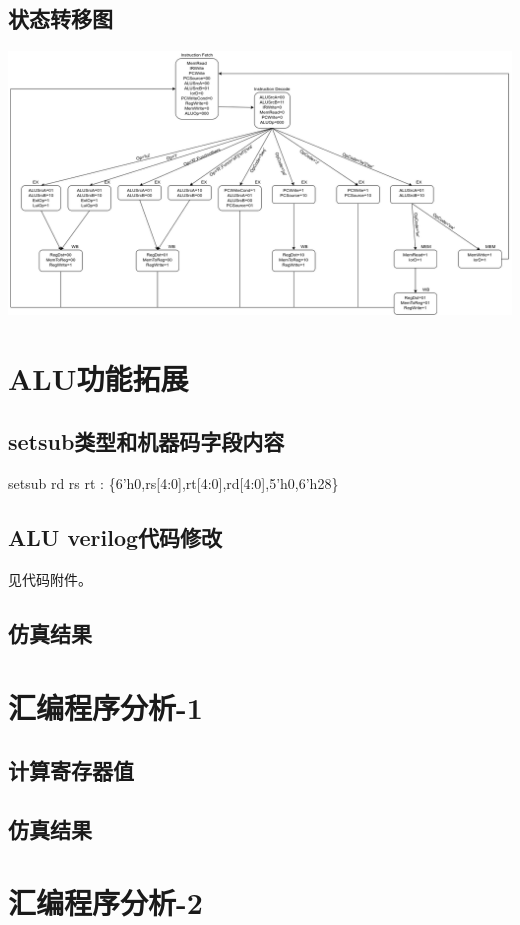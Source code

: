 \documentclass{article}
\begin{document}
\subsection{状态转移图}
\begin{center}
    \includegraphics[width = 18cm]{images/fsm.png}
\end{center}


\section{ALU功能拓展}
\subsection{setsub类型和机器码字段内容}
setsub rd rs rt : \{6'h0,rs[4:0],rt[4:0],rd[4:0],5'h0,6'h28\}
\subsection{ALU verilog代码修改}
见代码附件。
\subsection{仿真结果}

\section{汇编程序分析-1}
\subsection{计算寄存器值}
\subsection{仿真结果}

\section{汇编程序分析-2}
\end{document}
